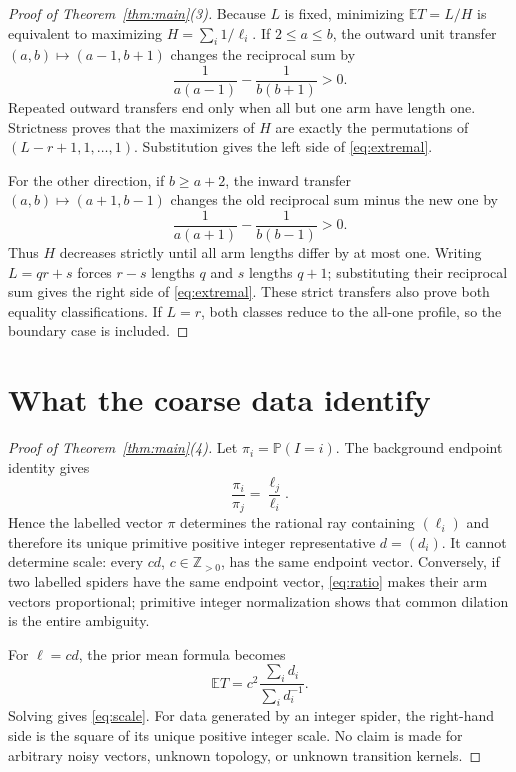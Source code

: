 \documentclass[a4paper,10pt]{amsart}
\theoremstyle{remark}
\newcommand{\Prob}{\mathbb P}
\newcommand{\E}{\mathbb E}
\begin{document}
\begin{proof}[Proof of Theorem~\ref{thm:main}(3)]
Because $L$ is fixed, minimizing $\E T=L/H$ is equivalent to maximizing
$H=\sum_i1/\ell_i$.  If $2\le a\le b$, the outward unit transfer
$(a,b)\mapsto(a-1,b+1)$ changes the reciprocal sum by
\[
 \frac1{a(a-1)}-\frac1{b(b+1)}>0.
\]
Repeated outward transfers end only when all but one arm have length one.
Strictness proves that the maximizers of $H$ are exactly the permutations of
$(L-r+1,1,\ldots,1)$.  Substitution gives the left side of
\eqref{eq:extremal}.

For the other direction, if $b\ge a+2$, the inward transfer
$(a,b)\mapsto(a+1,b-1)$ changes the old reciprocal sum minus the new one by
\[
 \frac1{a(a+1)}-\frac1{b(b-1)}>0.
\]
Thus $H$ decreases strictly until all arm lengths differ by at most one.
Writing $L=qr+s$ forces $r-s$ lengths $q$ and $s$ lengths $q+1$; substituting
their reciprocal sum gives the right side of \eqref{eq:extremal}.  These
strict transfers also prove both equality classifications.  If $L=r$, both
classes reduce to the all-one profile, so the boundary case is included.
\end{proof}

\section{What the coarse data identify}\label{sec:inverse}

\begin{proof}[Proof of Theorem~\ref{thm:main}(4)]
Let $\pi_i=\Prob(I=i)$.  The background endpoint identity gives
\begin{equation}\label{eq:ratio}
 \frac{\pi_i}{\pi_j}=\frac{\ell_j}{\ell_i}.
\end{equation}
Hence the labelled vector $\pi$ determines the rational ray containing
$(\ell_i)$ and therefore its unique primitive positive integer representative
$d=(d_i)$.  It cannot determine scale: every $cd$, $c\in\mathbb Z_{>0}$,
has the same endpoint vector.  Conversely, if two labelled spiders have the
same endpoint vector, \eqref{eq:ratio} makes their arm vectors proportional;
primitive integer normalization shows that common dilation is the entire
ambiguity.

For $\ell=cd$, the prior mean formula becomes
\[
 \E T=c^2\frac{\sum_i d_i}{\sum_i d_i^{-1}}.
\]
Solving gives \eqref{eq:scale}.  For data generated by an integer spider, the
right-hand side is the square of its unique positive integer scale.  No claim
is made for arbitrary noisy vectors, unknown topology, or unknown transition
kernels.
\end{proof}
\end{document}

